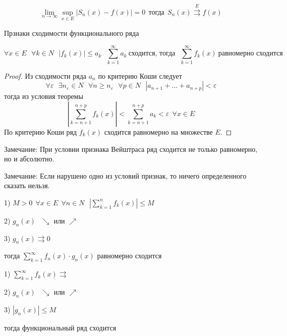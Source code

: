 \begin{block}
  $$
  \lim_{n \to \infty} \sup\limits_{x \in E} |S_n(x) - f(x)| = 0 ~~ \text{тогда} ~~
  S_n(x) \stackrel{E}{\rightrightarrows} f(x)
  $$
\end{block}

\begin{title}
  Прзнаки сходимости функционального ряда
\end{title}

\begin{block}
  $$
  \forall x \in E ~~~ \forall k \in N ~~~ |f_k(x)| \le a_k ~~~
  \sum_{k=1}^{\infty}a_k ~ \text{сходится, тогда} ~~~
  \sum_{k=1}^{\infty} f_k (x) ~ \text{равномерно сходится}
  $$
\end{block}

\begin{proof}
  Из сходимости ряда $a_n$ по критерию Коши следует
  $$
  \forall \varepsilon ~~~ \exists n_{\varepsilon} \in N ~~~ \forall n \ge
  n_{\varepsilon} ~~~ \forall p \in N ~~~ |a_{n+1} + \ldots + a_{n+p}| <
  \varepsilon
  $$
  тогда из условия теоремы
  $$
  \left| \sum_{k = n + 1}^{n+p} f_k(x) \right| < \sum_{k = n+1}^{n+p} a_k <
  \varepsilon ~~ \forall x \in E
  $$
  По критерию Коши ряд $f_k(x)$ сходится равномерно на множестве $E$.
\end{proof}

Замечание: При условии признака Вейштраса ряд сходится не только равномерно, но
и абсолютно.

Замечание: Если нарушено одно из условий признак, то ничего определенного
сказать нельзя.

\begin{block}
  1)
  $
  M > 0 ~~ \forall x \in E ~~ \forall n \in N ~~~
  \left| \sum_{k=1}^n f_k(x) \right| \le M
  $

  2) $g_n(x) ~~~ \searrow$ или $\nearrow$

  3) $g_n(x) \rightrightarrows 0$

  тогда $\sum_{k=1}^{\infty} f_n(x) \cdot g_n(x)$ равномерно сходится
\end{block}


\begin{block}
  1) $\sum_{k=1}^{\infty} f_k(x) \rightrightarrows$

  2) $g_n(x) ~~~ \searrow$ или $\nearrow$

  3) $|g_n(x)| \le M$

  тогда функциональный ряд сходится
\end{block}

